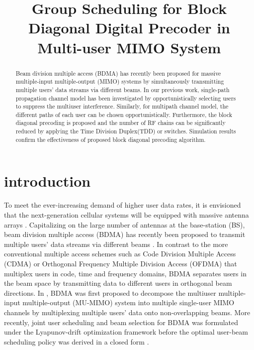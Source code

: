 \documentclass[conference]{IEEEtran}
\begin{document}
\title{Group Scheduling for Block Diagonal Digital Precoder in Multi-user MIMO System}
\author{}


\maketitle \thispagestyle{plain}

\begin{abstract}
Beam division multiple access (BDMA) has recently been proposed for massive multiple-input multiple-output (MIMO) systems by simultaneously transmitting multiple users' data streams via different beams. In our previous work, single-path propagation channel model has been investigated by opportunistically selecting users to suppress the multiuser interference. Similarly, for multipath channel model, the different paths of each user can be chosen opportunistically. Furthermore, the block diagonal precoding is proposed and the number of RF chains can be significantly reduced by applying the Time Division Duplex(TDD) or switches. Simulation results confirm the effectiveness of proposed block diagonal precoding algorithm.
\end{abstract}

\section{introduction}
To meet the ever-increasing demand of higher user data rates, it is envisioned that the next-generation cellular systems will be equipped with massive antenna arrays \cite{boccardi2014five}. Capitalizing on the large number of antennas at the base-station (BS), beam division multiple access (BDMA) has recently been proposed to transmit multiple users' data streams via different beams \cite{sun2015beam, Jiang2018}. In contrast to the more conventional multiple access schemes such as Code Division Multiple Access (CDMA) or Orthogonal Frequency Multiple Division Access (OFDMA) that multiplex users in code, time and frequency domains, BDMA separates users in the beam space by transmitting data to different users in orthogonal beam directions. In \cite{sun2015beam}, BDMA was first proposed to decompose the multiuser multiple-input multiple-output (MU-MIMO) system into multiple single-user MIMO channels by multiplexing multiple users' data onto non-overlapping beams. More recently, joint user scheduling and beam selection for BDMA was formulated under the Lyapunov-drift optimization framework before the optimal user-beam scheduling policy was derived in a closed form \cite{Jiang2018}.
\end{document}
